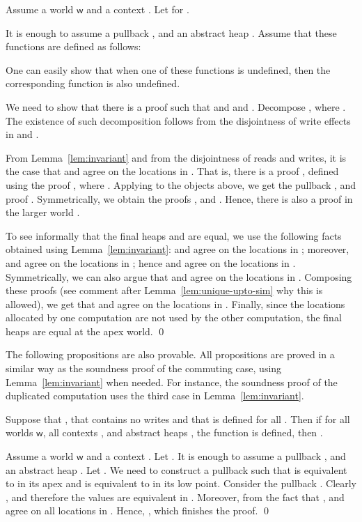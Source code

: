 \documentclass[orivec]{llncs}
\newif\iffull\fullfalse
\renewenvironment{proof}{\vspace{-1mm} \noindent {\bf Proof}\quad}{\qed}
\newcommand\w{\ensuremath{\mathsf{w}}\xspace}
\begin{document}
\begin{proof}
Assume a world \w and a context .
Let  for
. 

It is enough to assume a pullback 
, and an abstract heap . 
Assume that these functions are defined as follows:



\noindent
One can easily show that when one of these functions is undefined, then 
the corresponding function is also undefined. 

We need to show that there is a proof  such that
 and 
and .
Decompose , where
. 
The existence of such decomposition follows from the disjointness of write
effects in  and .

From Lemma~\ref{lem:invariant} and from 
the disjointness of reads and writes, it is the case that  and
 agree on the locations in .
That is, there is a proof , defined 
using the proof , where .
Applying  to the objects above,
we get the pullback , and  proof . Symmetrically, we obtain the proofs 
, and  . Hence, there is also a proof in the larger world .

To see informally that the final heaps  and  are
equal, we use
the following facts obtained using Lemma~\ref{lem:invariant}: 
and  agree on the locations in ; moreover, 
 and  agree on the locations in ; 
hence  and  agree on the locations in . Symmetrically, we can also argue that  and 
agree on the locations in . Composing these proofs 
(see comment after Lemma~\ref{lem:unique-upto-sim} why this is allowed), 
we get that  and  agree on the locations in . 
Finally, since the locations allocated by one computation are not used by
the other computation, the final heaps are equal at the
apex world.
\end{proof}

The following propositions are also provable. All propositions are proved
in a similar way as the soundness proof of the commuting case, using 
Lemma~\ref{lem:invariant} when needed. For instance, the soundness proof
of the duplicated computation uses the third case in
Lemma~\ref{lem:invariant}.

\begin{proposition}Suppose that
,
that \iffull  \else 
 contains no writes \fi and that  is defined for all
. 
Then if for all worlds \w, all contexts , and abstract heaps ,
the function  is defined, 
then .
\end{proposition}

\begin{proof}
Assume a world \w and a context .
Let . 
It is enough to assume a pullback 
, and an abstract heap . Let . We need to construct a pullback such that  is equivalent
to  in its apex and  is equivalent to  in
its low point. Consider the pullback . Clearly
, and therefore the values are equivalent in .
Moreover, from the fact that ,  and  agree on all locations in .
Hence, , which finishes the proof. 
\end{proof}
\end{document}
